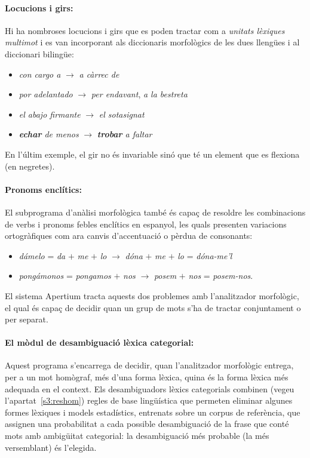  \paragraph{Locucions i girs:} Hi ha nombroses locucions i girs que es
 poden tractar com a \emph{unitats lèxiques multimot} i 
 es van incorporant als diccionaris morfològics de les dues
 llengües i al diccionari bilingüe:
 \begin{itemize}
 \item \emph{con cargo a} $\rightarrow$ \emph{a càrrec de}
 \item \emph{por adelantado} $\rightarrow$ \emph{per endavant}, \emph{a la bestreta}
 \item \emph{el abajo firmante} $\rightarrow$ \emph{el sotasignat}
 \item \emph{{\bf echar} de menos} $\rightarrow$ \emph{{\bf trobar} a faltar}
 \end{itemize}
 En l'últim exemple, el gir no és invariable sinó que té un element que
 es flexiona (en negretes).

 \paragraph{Pronoms enclítics:} El subprograma d'anàlisi morfològica també és capaç de resoldre les
 combinacions de verbs i pronoms febles enclítics en espanyol, les
 quals presenten variacions ortogràfiques com ara canvis d'accentuació
 o pèrdua de consonants:
 \begin{itemize}
 \item \emph{d\'{a}melo} = \emph{da} $+$ \emph{me} $+$ \emph{lo} $\rightarrow$
 \emph{dóna} $+$ \emph{me} $+$ \emph{lo} = \emph{dóna-me'l}
 \item \emph{pong\'{a}monos} = \emph{pongamos} $+$ \emph{nos} $\rightarrow$ {\em
 posem} $+$ \emph{nos} = \emph{posem-nos}.  
 \end{itemize}

 El sistema Apertium tracta aquests dos problemes amb l'analitzador
 morfològic, el qual és capaç de decidir quan un grup de mots s'ha de
 tractar conjuntament o per separat.

 \paragraph{El mòdul de desambiguació lèxica categorial:}
Aquest programa s'encarrega de decidir, quan l'analitzador morfològic
entrega, per a un mot homògraf, més d'una forma lèxica, quina és la
forma lèxica més adequada en el context. Els desambiguadors lèxics
categorials combinen (vegeu l'apartat~\ref{s3:reshom}) regles de base
lingüística que permeten eliminar algunes formes lèxiques i models
estadístics, entrenats sobre un corpus de referència, que assignen una
probabilitat a cada possible desambiguació de la frase que conté mots
amb ambigüitat categorial: la desambiguació més probable (la més
versemblant) és l'elegida.


